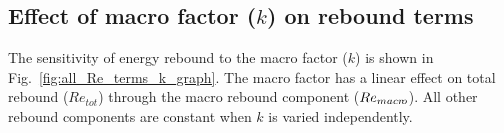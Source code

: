 \documentclass[12pt]{article}\usepackage[]{graphicx}\usepackage[]{xcolor}
\begin{document}

  
\subsection{Effect of macro factor ($k$) on rebound terms} 
\label{sec:effect_of_macro_factor}

The sensitivity of energy rebound 
to the macro factor ($k$) is shown 
in Fig.~\ref{fig:all_Re_terms_k_graph}.
The macro factor has a linear effect on total rebound ($Re_{tot}$)
through the macro rebound component ($Re_{macr\!o}$).
All other rebound components are constant when $k$ is varied independently.

\end{document}
